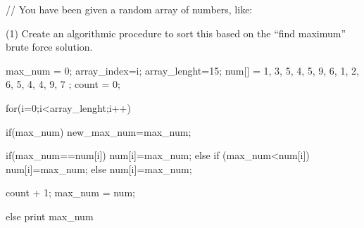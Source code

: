 //
You have been given a random array of numbers, like:


(1) Create an algorithmic procedure to sort this based on the “find maximum” brute force solution. 

max_num = 0;
array_index=i;
array_lenght=15;
num[] = {1, 3, 5, 4, 5, 9, 6, 1, 2, 6, 5, 4, 4, 9, 7 };
count = 0;


for(i=0;i<array_lenght;i++){
 

if(max_num)
new_max_num=max_num;

 if(max_num==num[i]){
     num[i]=max_num;
 }else if (max_num<num[i]){
     num[i]=max_num;
 }else{
      num[i]=max_num;
 }
 

}
  count + 1;
  max_num = num;

else print max_num
